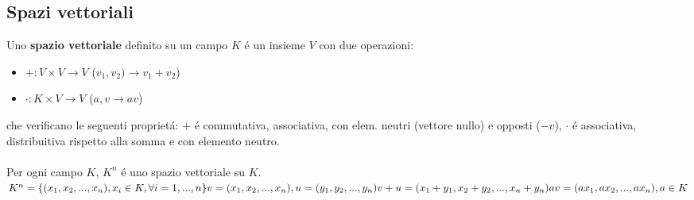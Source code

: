 \documentclass{article}
\begin{document}
\subsection{Spazi vettoriali}
Uno \textbf{spazio vettoriale} definito su un campo $K$ é un insieme $V$ con due operazioni:
\begin{itemize}
	\item[] $+ : V \times V \rightarrow V$ ($v_1, v_2) \rightarrow v_1 + v_2$)
	\item[] $\cdot : K \times V \rightarrow V$ ($a, v \rightarrow av$)
\end{itemize}
che verificano le seguenti proprietá: $+$ é commutativa, associativa, con elem. neutri (vettore nullo) e opposti ($-v$), $\cdot$ é associativa, distribuitiva rispetto alla somma e con elemento neutro.\\\\
Per ogni campo $K$, $K^n$ é uno spazio vettoriale su $K$.\\
$K^n = \{(x_1, x_2, ..., x_n), x_i \in K, \forall i=1, ..., n\} \\
v = (x_1, x_2, ..., x_n), u = (y_1, y_2, ..., y_n) \\
v + u = (x_1 + y_1, x_2 + y_2, ..., x_n + y_n) \\
av = (ax_1, ax_2, ..., ax_n), a \in K
$
\end{document}

